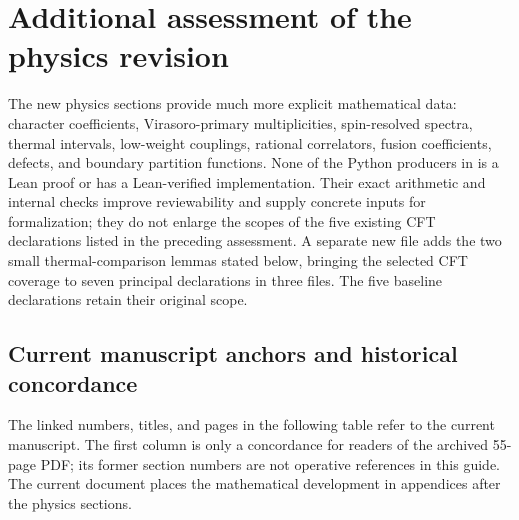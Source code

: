 \section{Additional assessment of the physics revision}
\label{sec:physics-lean-assessment}

The new physics sections provide much more explicit mathematical data:
character coefficients, Virasoro-primary multiplicities, spin-resolved
spectra, thermal intervals, low-weight couplings, rational correlators,
fusion coefficients, defects, and boundary partition functions. None
of the Python producers in  is a Lean
proof or has a Lean-verified implementation. Their exact arithmetic
and internal checks improve reviewability and supply concrete inputs
for formalization; they do not enlarge the scopes of the five existing
CFT declarations listed in the preceding assessment. A separate new
file adds the two small thermal-comparison lemmas stated below, bringing
the selected CFT coverage to seven principal declarations in three
files. The five baseline declarations retain their original scope.

\subsection{Current manuscript anchors and historical concordance}

The linked numbers, titles, and pages in the following table refer to
the current manuscript. The first column is only a concordance for
readers of the archived 55-page PDF; its former section numbers are
not operative references in this guide. The current document places
the mathematical development in appendices after the physics sections.

